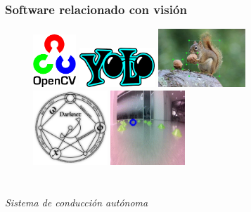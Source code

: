 \documentclass{beamer}
\begin{document}
\begin{frame}
	\frametitle{Software relacionado con visión}
	\begin{figure}
		\centering
		\includegraphics[height=2cm]{figs/opencvlogo}\hspace{0.8cm}
		\includegraphics[height=1.5cm]{figs/yolologo}\hspace{0.6cm}
		\includegraphics[width=3.3cm]{figs/labelimg}\hspace{0.8cm}\\
		\vspace{1cm}\includegraphics[width=2.8cm]{figs/darknetlogo}\hspace{0.8cm}
		\includegraphics[width=2.8cm]{figs/jetracerframe}
	\end{figure}
\end{frame}


\section*{}
\begin{frame}{}
	\centering \Huge
	\emph{Sistema de conducción autónoma}
\end{frame}
\end{document}
